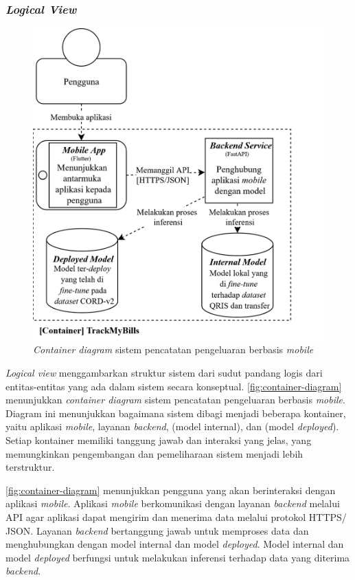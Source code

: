 \subsubsection{\emph{Logical View}}
\label{subsubsec:logical-view}

\begin{figure}[htbp]
    \centering
    \includegraphics[width=.8\textwidth]{images/container-diagram.png}
    \caption{\emph{Container diagram} sistem pencatatan pengeluaran berbasis \emph{mobile}}
    \label{fig:container-diagram}
\end{figure}

\emph{Logical view} menggambarkan struktur sistem dari sudut pandang logis dari entitas-entitas yang ada dalam sistem secara konseptual. \autoref{fig:container-diagram} menunjukkan \emph{container diagram} sistem pencatatan pengeluaran berbasis \emph{mobile}. Diagram ini menunjukkan bagaimana sistem dibagi menjadi beberapa kontainer, yaitu aplikasi \emph{mobile}, layanan \emph{backend}, \donutqristf{} (model internal), dan \donutcord{} (model \emph{deployed}). Setiap kontainer memiliki tanggung jawab dan interaksi yang jelas, yang memungkinkan pengembangan dan pemeliharaan sistem menjadi lebih terstruktur.

\autoref{fig:container-diagram} menunjukkan pengguna yang akan berinteraksi dengan aplikasi \emph{mobile}. Aplikasi \emph{mobile} berkomunikasi dengan layanan \emph{backend} melalui API agar aplikasi dapat mengirim dan menerima data melalui protokol HTTPS/ JSON. Layanan \emph{backend} bertanggung jawab untuk memproses data dan menghubungkan dengan model internal dan model \emph{deployed}. Model internal dan model \emph{deployed} berfungsi untuk melakukan inferensi terhadap data yang diterima \emph{backend}.


